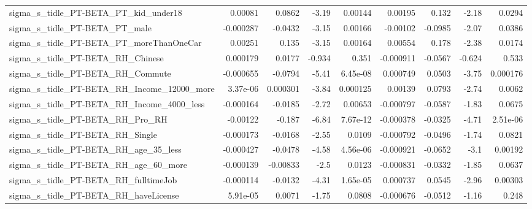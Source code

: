 \begin{tabular}{lrrrrrrrr}
sigma\_s\_tidle\_PT-BETA\_PT\_kid\_under18               &     0.00081 &       0.0862 &     -3.19 &  0.00144 &    0.00195 &       0.132 &        -2.18 &        0.0294 \\
sigma\_s\_tidle\_PT-BETA\_PT\_male                      &   -0.000287 &      -0.0432 &     -3.15 &  0.00166 &   -0.00102 &     -0.0985 &        -2.07 &        0.0386 \\
sigma\_s\_tidle\_PT-BETA\_PT\_moreThanOneCar            &     0.00251 &        0.135 &     -3.15 &  0.00164 &    0.00554 &       0.178 &        -2.38 &        0.0174 \\
sigma\_s\_tidle\_PT-BETA\_RH\_Chinese                   &    0.000179 &       0.0177 &    -0.934 &    0.351 &  -0.000911 &     -0.0567 &       -0.624 &         0.533 \\
sigma\_s\_tidle\_PT-BETA\_RH\_Commute                   &   -0.000655 &      -0.0794 &     -5.41 & 6.45e-08 &   0.000749 &      0.0503 &        -3.75 &      0.000176 \\
sigma\_s\_tidle\_PT-BETA\_RH\_Income\_12000\_more         &    3.37e-06 &     0.000301 &     -3.84 & 0.000125 &    0.00139 &      0.0793 &        -2.74 &        0.0062 \\
sigma\_s\_tidle\_PT-BETA\_RH\_Income\_4000\_less          &   -0.000164 &      -0.0185 &     -2.72 &  0.00653 &  -0.000797 &     -0.0587 &        -1.83 &        0.0675 \\
sigma\_s\_tidle\_PT-BETA\_RH\_Pro\_RH                    &    -0.00122 &       -0.187 &     -6.84 & 7.67e-12 &  -0.000378 &     -0.0325 &        -4.71 &      2.51e-06 \\
sigma\_s\_tidle\_PT-BETA\_RH\_Single                    &   -0.000173 &      -0.0168 &     -2.55 &   0.0109 &  -0.000792 &     -0.0496 &        -1.74 &        0.0821 \\
sigma\_s\_tidle\_PT-BETA\_RH\_age\_35\_less               &   -0.000427 &      -0.0478 &     -4.58 & 4.56e-06 &  -0.000921 &     -0.0652 &         -3.1 &       0.00192 \\
sigma\_s\_tidle\_PT-BETA\_RH\_age\_60\_more               &   -0.000139 &     -0.00833 &      -2.5 &   0.0123 &  -0.000831 &     -0.0332 &        -1.85 &        0.0637 \\
sigma\_s\_tidle\_PT-BETA\_RH\_fulltimeJob               &   -0.000114 &      -0.0132 &     -4.31 & 1.65e-05 &   0.000737 &      0.0545 &        -2.96 &       0.00303 \\
sigma\_s\_tidle\_PT-BETA\_RH\_haveLicense               &    5.91e-05 &       0.0071 &     -1.75 &   0.0808 &  -0.000676 &     -0.0512 &        -1.16 &         0.248 \\

\end{tabular}
